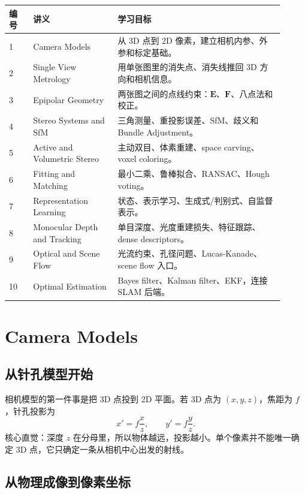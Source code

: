 \documentclass[11pt]{article}
\newcommand{\E}{\mathbf{E}}
\newcommand{\F}{\mathbf{F}}
\begin{document}
\begin{center}
\begin{tabular}{p{0.08\linewidth}p{0.28\linewidth}p{0.55\linewidth}}
\toprule
编号 & 讲义 & 学习目标 \\
\midrule
1 & Camera Models & 从 3D 点到 2D 像素，建立相机内参、外参和标定基础。 \\
2 & Single View Metrology & 用单张图里的消失点、消失线推回 3D 方向和相机信息。 \\
3 & Epipolar Geometry & 两张图之间的点线约束：$\E$、$\F$、八点法和校正。 \\
4 & Stereo Systems and SfM & 三角测量、重投影误差、SfM、歧义和 Bundle Adjustment。 \\
5 & Active and Volumetric Stereo & 主动双目、体素重建、space carving、voxel coloring。 \\
6 & Fitting and Matching & 最小二乘、鲁棒拟合、RANSAC、Hough voting。 \\
7 & Representation Learning & 状态、表示学习、生成式/判别式、自监督表示。 \\
8 & Monocular Depth and Tracking & 单目深度、光度重建损失、特征跟踪、dense descriptors。 \\
9 & Optical and Scene Flow & 光流约束、孔径问题、Lucas-Kanade、scene flow 入口。 \\
10 & Optimal Estimation & Bayes filter、Kalman filter、EKF，连接 SLAM 后端。 \\
\bottomrule
\end{tabular}
\end{center}

\section{Camera Models}

\subsection{从针孔模型开始}

相机模型的第一件事是把 3D 点投到 2D 平面。若 3D 点为 $(x,y,z)$，焦距为 $f$，针孔投影为
\[
  x' = f\frac{x}{z}, \qquad y' = f\frac{y}{z}.
\]
核心直觉：深度 $z$ 在分母里，所以物体越远，投影越小。单个像素并不能唯一确定 3D 点，它只确定一条从相机中心出发的射线。

\subsection{从物理成像到像素坐标}
\end{document}
